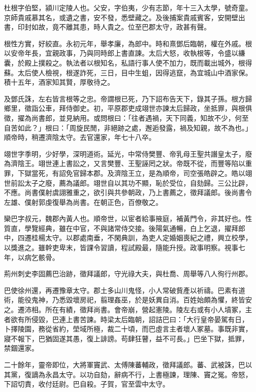 
\begin{pinyinscope}
杜根字伯堅，潁川定陵人也。父安，字伯夷，少有志節，年十三入太學，號奇童。京師貴戚慕其名，或遺之書，安不發，悉壁藏之。及後捕案貴戚賓客，安開壁出書，印封如故，竟不離其患，時人貴之。位至巴郡太守，政甚有聲。

根性方實，好絞直。永初元年，舉孝廉，為郎中。時和熹鄧后臨朝，權在外戚。根以安帝年長，宜親政事，乃與同時郎上書直諫。太后大怒，收執根等，令盛以縑囊，於殿上撲殺之。執法者以根知名，私語行事人使不加力，既而載出城外，根得蘇。太后使人檢視，根遂詐死，三日，目中生蛆，因得逃竄，為宜城山中酒家保。積十五年，酒家知其賢，厚敬待之。

及鄧氏誅，左右皆言根等之忠。帝謂根已死，乃下詔布告天下，錄其子孫。根方歸鄉里，徵詣公車，拜侍御史。初，平原郡吏成翊世亦諫太后歸政，坐抵罪，與根俱徵，擢為尚書郎，並見納用。或問根曰：「往者遇禍，天下同義，知故不少，何至自苦如此？」根曰：「周旋民閒，非絕跡之處，邂逅發露，禍及知親，故不為也。」順帝時，稍遷濟陰太守。去官還家，年七十八卒。

翊世字季明，少好學，深明道術。延光，中常侍樊豐、帝乳母王聖共譖皇太子，廢為濟陰王。翊世連上書訟之，又言樊豐、王聖誣罔之狀。帝既不從，而豐等陷以重罪，下獄當死，有詔免官歸本郡。及濟陰王立，是為順帝，司空張皓辟之。皓以翊世前訟太子之廢，薦為議郎。翊世自以其功不顯，恥於受位，自劾歸。三公比辟，不應。尚書僕射虞詡雅重之，欲引與共參朝政，乃上書薦之，徵拜議郎。後尚書令左雄、僕射郭虔復舉為尚書。在朝正色，百僚敬之。

欒巴字叔元，魏郡內黃人也。順帝世，以宦者給事掖庭，補黃門令，非其好也。性質直，學覽經典，雖在中官，不與諸常侍交接。後陽氣通暢，白上乞退，擢拜郎中，四遷桂楊太守。以郡處南垂，不閑典訓，為吏人定婚姻喪紀之禮，興立校學，以獎進之。雖幹吏卑末，皆課令習讀，程試殿最，隨能升授。政事明察。視事七年，以病乞骸骨。

荊州刺史李固薦巴治跡，徵拜議郎，守光祿大夫，與杜喬、周舉等八人徇行州郡。

巴使徐州還，再遷豫章太守。郡土多山川鬼怪，小人常破貲產以祈禱。巴素有道術，能役鬼神，乃悉毀壞房祀，翦理姦巫，於是妖異自消。百姓始頗為懼，終皆安之。遷沛相。所在有績，徵拜尚書。會帝崩，營起憲陵。陵左右或有小人墳冢，主者欲有所侵毀，巴連上書苦諫。時梁太后臨朝，詔詰巴曰：「大行皇帝晏駕有日，卜擇陵園，務從省約，塋域所極，裁二十頃，而巴虛言主者壞人冢墓。事既非實，寢不報下，巴猶固遂其愚，復上誹謗。苟肆狂瞽，益不可長。」巴坐下獄，抵罪，禁錮還家。

二十餘年，靈帝即位，大將軍竇武、太傅陳蕃輔政，徵拜議郎。蕃、武被誅，巴以其黨，復謫為永昌太守。以功自劾，辭病不行，上書極諫，理陳、竇之冤。帝怒，下詔切責，收付廷尉。巴自殺。子賀，官至雲中太守。


\end{pinyinscope}
